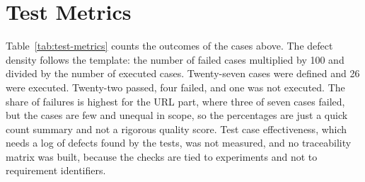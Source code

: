 \documentclass{FastFyp}
\begin{document}
\section{Test Metrics}
\label{sec:test-metrics}
Table~\ref{tab:test-metrics} counts the outcomes of the cases above. The defect density follows the template: the number of failed cases multiplied by 100 and divided by the number of executed cases. Twenty-seven cases were defined and 26 were executed. Twenty-two passed, four failed, and one was not executed. The share of failures is highest for the URL part, where three of seven cases failed, but the cases are few and unequal in scope, so the percentages are just a quick count summary and not a rigorous quality score. Test case effectiveness, which needs a log of defects found by the tests, was not measured, and no traceability matrix was built, because the checks are tied to experiments and not to requirement identifiers.

\begin{table}[H]
	\centering
	\caption{Test case metrics for the three parts.}
	\label{tab:test-metrics}
	\small
\end{table}
\end{document}
